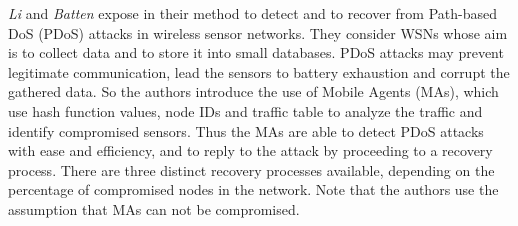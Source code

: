 
\textit{Li} and \textit{Batten} expose in
\cite{LB09}
their method to detect and to recover from Path-based DoS (PDoS) attacks in wireless sensor networks.
They consider WSNs whose aim is to collect data and to store it into small databases.
PDoS attacks may prevent legitimate communication, lead the sensors to battery exhaustion and corrupt the gathered data.
So the authors introduce the use of Mobile Agents (MAs), which use hash function values, node IDs and traffic table to analyze the traffic and identify compromised sensors.
Thus the MAs are able to detect PDoS attacks with ease and efficiency, and to reply to the attack by proceeding to a recovery process.
There are three distinct recovery processes available, depending on the percentage of compromised nodes in the network.
Note that the authors use the assumption that MAs can not be compromised.



